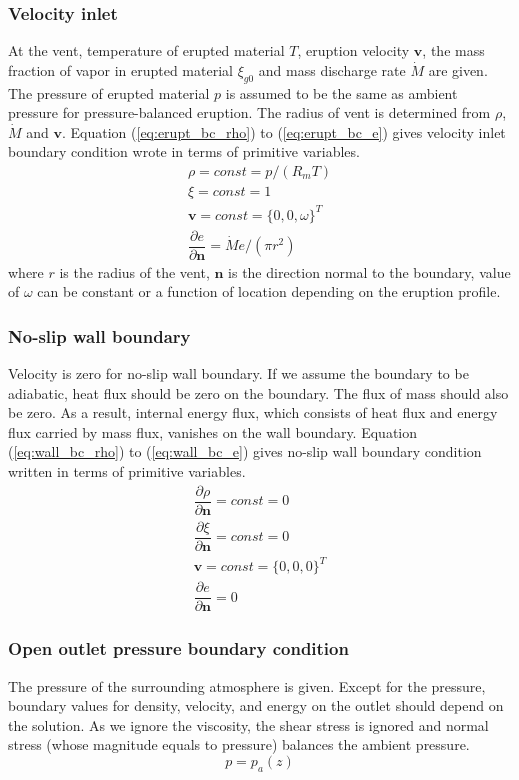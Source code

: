 \subsubsection{Velocity inlet}
At the vent, temperature of erupted material $T$, eruption velocity $\textbf{v}$, the mass fraction of vapor in erupted material $\xi_{g0}$ and mass discharge rate $\dot M$ are given. The pressure of erupted material $p$ is assumed to be the same as ambient pressure for pressure-balanced eruption. The radius of vent is determined from $\rho$, $\dot M$ and $\textbf{v}$. Equation (\ref{eq:erupt_bc_rho}) to (\ref{eq:erupt_bc_e}) gives velocity inlet boundary condition wrote in terms of primitive variables.
\begin{align}
\rho =const = p/\left(R_m T\right) \label{eq:erupt_bc_rho} \\
\xi=const=1 \label{eq:erupt_bc_xi}\\
\textbf{v} = const =\{0,0, \omega \}^T \label{eq:erupt_bc_v}\\
\dfrac{\partial e}{\partial \textbf{n}}=\dot M e /\left(\pi r^2\right) \label{eq:erupt_bc_e}
\end{align} 
where $r$ is the radius of the vent, $\textbf{n}$ is the direction normal to the boundary, value of $\omega$ can be constant or a function of location depending on the eruption profile.

\subsubsection{No-slip wall boundary}
Velocity is zero for no-slip wall boundary. If we assume the boundary to be adiabatic, heat flux should be zero on the boundary. The flux of mass should also be zero. As a result, internal energy flux, which consists of heat flux and energy flux carried by mass flux, vanishes on the wall boundary. Equation (\ref{eq:wall_bc_rho}) to (\ref{eq:wall_bc_e}) gives no-slip wall boundary condition written in terms of primitive variables.
\begin{align}
\dfrac{\partial \rho}{\partial \textbf{n}} = const = 0\label{eq:wall_bc_rho} \\
\dfrac{\partial \xi}{\partial \textbf{n}} = const = 0 \label{eq:wall_bc_xi}\\ 
\textbf{v} = const =\{0,0,0\}^T \label{eq:wall_bc_v}\\
\dfrac{\partial e }{\partial \textbf{n}} = 0\label{eq:wall_bc_e}
\end{align} 

\subsubsection{Open outlet pressure boundary condition}
The pressure of the surrounding atmosphere is given. Except for the pressure, boundary values for density, velocity, and energy on the outlet should depend on the solution. As we ignore the viscosity, the shear stress is ignored and normal stress (whose magnitude equals to pressure) balances the ambient pressure.
\begin{equation}
p = p_a\left(z\right)  \label{eq:pressure_bc_p} 
\end{equation}

